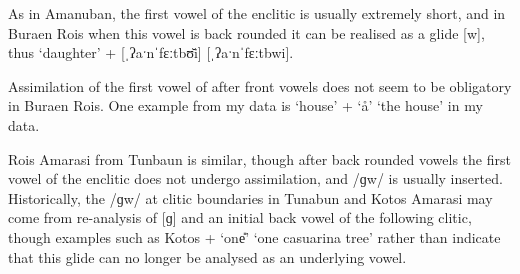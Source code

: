 \begin{exe}
	\label{ex:Buraen}
\end{exe}

As in Amanuban, the first vowel of the enclitic 
is usually extremely short,
and in Buraen Ro{\Q}is when this vowel is back rounded 
it can be realised as a glide [w],
thus  `daughter' +  {\ra}
 [ˌʔaˑnˈfɛːtbʊ̆i] {\tl} [ˌʔaˑnˈfɛːtbwi]. 

Assimilation of the first vowel of  after front
vowels does not seem to be obligatory in Buraen Ro{\Q}is.
One example from my data is  `house' + 
`{\aa}' {\ra}  `the house' in my data.

Ro{\Q}is Amarasi from Tunbaun is similar,
though after back rounded vowels the first vowel
of the enclitic does not undergo assimilation,
and /ɡw/ is usually inserted.
Historically, the /ɡw/ at clitic boundaries in 
Tunabun and Kotos Amarasi may come from re-analysis of
[ɡ] and an initial back vowel of the following clitic,
though examples such as Kotos  + 
`one{\U}' {\ra}  `one casuarina tree'
rather than  indicate that this
glide can no longer be analysed as an underlying vowel.

